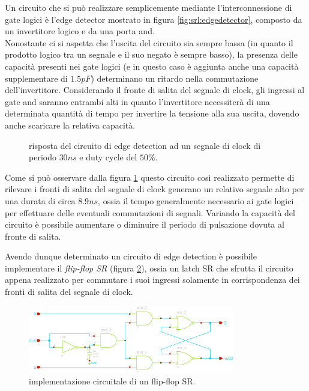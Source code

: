 	Un circuito che si può realizzare semplicemente mediante l'interconnessione di gate logici è l'edge detector mostrato in figura \ref{fig:srl:edgedetector}, composto da un invertitore logico e da una porta and.\\
	Nonostante ci si aspetta che l'uscita del circuito sia sempre bassa (in quanto il prodotto logico tra un segnale e il suo negato è sempre basso), la presenza delle capacità presenti nei gate logici (e in questo caso è aggiunta anche una capacità supplementare di $1.5pF$) determinano un ritardo nella commutazione dell'invertitore. Considerando il fronte di salita del segnale di clock, gli ingressi al gate and saranno entrambi alti in quanto l'invertitore necessiterà di una determinata quantità di tempo per invertire la tensione alla sua uscita, dovendo anche scaricare la relativa capacità.
	\begin{figure}[bht]
		\centering
		
		\vspace{3mm}
		\caption{risposta del circuito di edge detection ad un segnale di clock di periodo $30ns$ e duty cycle del $50\%$.}
		\label{fig:srl:edgesimulation}
	\end{figure}
	
	Come si può osservare dalla figura \ref{fig:srl:edgesimulation} questo circuito così realizzato permette di rilevare i fronti di salita del segnale di clock generano un relativo segnale alto per una durata di circa $8.9ns$, ossia il tempo generalmente necessario ai gate logici per effettuare delle eventuali commutazioni di segnali. Variando la capacità del circuito è possibile aumentare o diminuire il periodo di pulsazione dovuta al fronte di salita.
	
	\vspace{3mm}
	Avendo dunque determinato un circuito di edge detection è possibile implementare il \textit{flip-flop SR} (figura \ref{fig:srl:flipflop}), ossia un latch SR che sfrutta il circuito appena realizzato per commutare i suoi ingressi solamente in corrispondenza dei fronti di salita del segnale di clock.
	
	\begin{figure}[bht]
		\centering
		\includegraphics[width=9cm]{Immagini/srflipflop}
		\caption{implementazione circuitale di un flip-flop SR.}
		\label{fig:srl:flipflop}
	\end{figure}
	
